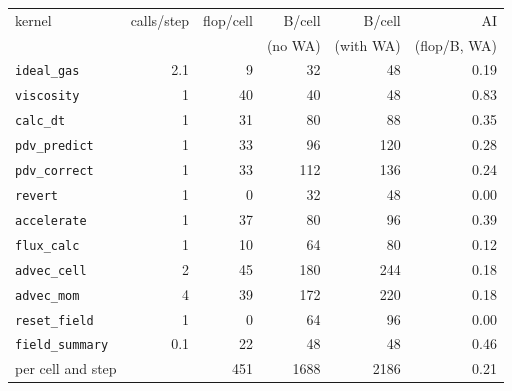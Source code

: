 \begin{tabular}{lrrrrr}
\toprule
kernel & calls/step & flop/cell & B/cell & B/cell & AI \\
 & & & (no WA) & (with WA) & (flop/B, WA) \\
\midrule
\texttt{ideal\_gas} & 2.1 & 9 & 32 & 48 & 0.19 \\
\texttt{viscosity} & 1 & 40 & 40 & 48 & 0.83 \\
\texttt{calc\_dt} & 1 & 31 & 80 & 88 & 0.35 \\
\texttt{pdv\_predict} & 1 & 33 & 96 & 120 & 0.28 \\
\texttt{pdv\_correct} & 1 & 33 & 112 & 136 & 0.24 \\
\texttt{revert} & 1 & 0 & 32 & 48 & 0.00 \\
\texttt{accelerate} & 1 & 37 & 80 & 96 & 0.39 \\
\texttt{flux\_calc} & 1 & 10 & 64 & 80 & 0.12 \\
\texttt{advec\_cell} & 2 & 45 & 180 & 244 & 0.18 \\
\texttt{advec\_mom} & 4 & 39 & 172 & 220 & 0.18 \\
\texttt{reset\_field} & 1 & 0 & 64 & 96 & 0.00 \\
\texttt{field\_summary} & 0.1 & 22 & 48 & 48 & 0.46 \\
\midrule
per cell and step & & 451 & 1688 & 2186 & 0.21 \\
\bottomrule
\end{tabular}
